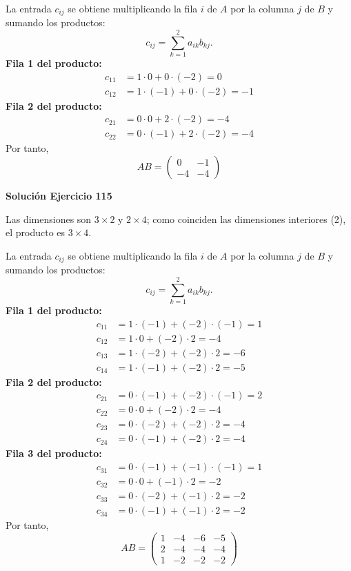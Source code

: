 La entrada $c_{ij}$ se obtiene multiplicando la fila $i$ de $A$ por la columna $j$ de $B$ y sumando los productos:
\[
c_{ij}=\sum_{k=1}^{2} a_{ik}b_{kj}.
\]
\textbf{Fila 1 del producto:}
\[
\begin{aligned}c_{11}&=1\cdot 0+0\cdot (-2)=0\\c_{12}&=1\cdot (-1)+0\cdot (-2)=-1\end{aligned}
\]
\textbf{Fila 2 del producto:}
\[
\begin{aligned}c_{21}&=0\cdot 0+2\cdot (-2)=-4\\c_{22}&=0\cdot (-1)+2\cdot (-2)=-4\end{aligned}
\]
Por tanto,
\[
\boxed{AB=\begin{pmatrix}0&-1\\-4&-4\end{pmatrix}}
\]

\par\bigskip\noindent\textbf{Solución Ejercicio 115}\par\nobreak
Las dimensiones son $3\times2$ y $2\times4$; como coinciden las dimensiones interiores (2), el producto es $3\times4$.

La entrada $c_{ij}$ se obtiene multiplicando la fila $i$ de $A$ por la columna $j$ de $B$ y sumando los productos:
\[
c_{ij}=\sum_{k=1}^{2} a_{ik}b_{kj}.
\]
\textbf{Fila 1 del producto:}
\[
\begin{aligned}c_{11}&=1\cdot (-1)+(-2)\cdot (-1)=1\\c_{12}&=1\cdot 0+(-2)\cdot 2=-4\\c_{13}&=1\cdot (-2)+(-2)\cdot 2=-6\\c_{14}&=1\cdot (-1)+(-2)\cdot 2=-5\end{aligned}
\]
\textbf{Fila 2 del producto:}
\[
\begin{aligned}c_{21}&=0\cdot (-1)+(-2)\cdot (-1)=2\\c_{22}&=0\cdot 0+(-2)\cdot 2=-4\\c_{23}&=0\cdot (-2)+(-2)\cdot 2=-4\\c_{24}&=0\cdot (-1)+(-2)\cdot 2=-4\end{aligned}
\]
\textbf{Fila 3 del producto:}
\[
\begin{aligned}c_{31}&=0\cdot (-1)+(-1)\cdot (-1)=1\\c_{32}&=0\cdot 0+(-1)\cdot 2=-2\\c_{33}&=0\cdot (-2)+(-1)\cdot 2=-2\\c_{34}&=0\cdot (-1)+(-1)\cdot 2=-2\end{aligned}
\]
Por tanto,
\[
\boxed{AB=\begin{pmatrix}1&-4&-6&-5\\2&-4&-4&-4\\1&-2&-2&-2\end{pmatrix}}
\]

